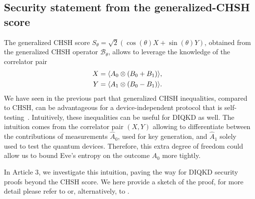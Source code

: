 \subsection{Security statement from the generalized-CHSH score}
\label{sec:Pavel}

The generalized CHSH score $S_\theta=\sqrt{2}(\cos(\theta)X+\sin(\theta)Y)$, obtained from the generalized CHSH operator $\mathcal{B}_\theta$, allows to leverage the knowledge of the correlator pair
\begin{equation}
	\begin{split}
		X = \langle {A_0 \otimes (B_0+B_1)} \rangle,\\
		Y = \langle {A_1 \otimes (B_0-B_1)} \rangle.
	\end{split}
\end{equation}
We have seen in the previous part that generalized CHSH inequalities, compared to CHSH, can be advantageous for a device-independent protocol that is self-testing~\cite{Valcarce2022}.
Intuitively, these inequalities can be useful for DIQKD as well.
The intuition comes from the correlator pair $(X,Y)$ allowing to differentiate between the contributions of measurements $\hat{A}_0$, used for key generation, and $\hat{A}_1$ solely used to test the quantum devices.
Therefore, this extra degree of freedom could allow us to bound Eve's entropy on the outcome $A_0$ more tightly.

In Article 3, we investigate this intuition, paving the way for DIQKD security proofs beyond the CHSH score. 
We here provide a sketch of the proof, for more detail please refer to \cite{Sekatski2021} or, alternatively, to \cite{Woodhead2021}.


\medbreak


